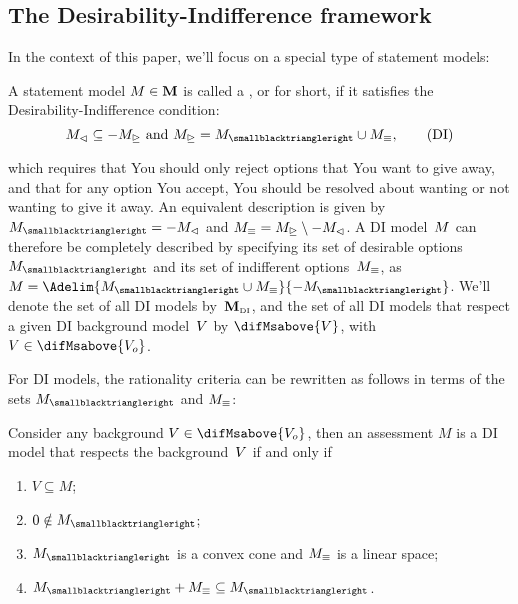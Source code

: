 \documentclass[preprint]{isipta2025}
\begin{document}
\subsection{The Desirability-Indifference framework}\label{sec::desirability:indifference}
In the context of this paper, we'll focus on a special type of statement models:
\begin{definition}
A statement model \(M\in\mathbf{M}\) is called a , or  for short, if it satisfies the Desirability-Indifference condition:
\begin{equation}\label{eq:DI:condition}
\M_\rej\subseteq-\M_\acc
\text{ and }
\M_\acc=\M_\des\union\M_\indif,
\tag{DI}
\end{equation}
\end{definition}
\noindent which requires that You should only reject options that You want to give away, and that for any option You accept, You should be resolved about wanting or not wanting to give it away.
An equivalent description is given by \(\M_\des=-\M_\rej\) and \(M_\equiv=M_\trianglerighteq\setminus-M_\vartriangleleft\).
A DI model~\(M\) can therefore be completely described by specifying its set of desirable options~\(\M_\des\) and its set of indifferent options~\(M_\equiv\), as \(\M=\Adelim{\M_\des\cup\M_\indif}{-\M_\des}\).
We'll denote the set of all DI models by~\(\difMs\), and the set of all DI models that respect a given DI background model~\(V\) by \(\difMsabove{\bgM}\), with \(\bgM\in\difMsabove{\zeroM}\).

For DI models, the rationality criteria  can be rewritten as follows in terms of the sets \(\M_\des\) and \(M_\equiv\):
\begin{theorem}%
Consider any background \(\bgM\in\difMsabove{\zeroM}\), then an assessment \(M\) is a DI model that respects the background~\(V\) if and only if
\begin{enumerate}[label={\upshape DI\arabic*.},ref={\upshape DI\arabic*},series=DI,widest=4,leftmargin=*,itemsep=0pt]
\item\label{axiom:DI:background} \(V\subseteq M\);
\item\label{axiom:DI:zero:not:desirable} \(0\notin\M_\des\);
\item\label{axiom:DI:deductive:closedness} \(\M_\des\) is a convex cone and \(M_\equiv\) is a linear space;
\item\label{axiom:DI:compatibility} \(\M_\des+\M_\indif\subseteq\M_\des\).
\end{enumerate}
\end{theorem}
\end{document}
